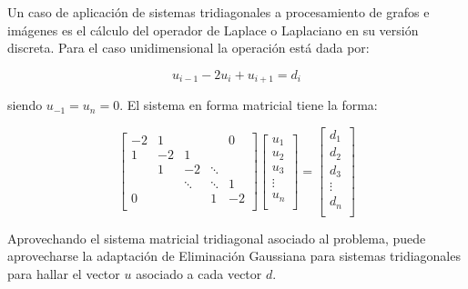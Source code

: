 Un caso de aplicación de sistemas tridiagonales a procesamiento de grafos e imágenes es el cálculo del operador de Laplace o Laplaciano en su versión discreta. Para el caso unidimensional la operación está dada por:

\begin{equation} \label{eq:laplaciano}
	u_{i-1} - 2u_{i} + u_{i+1} = d_{i}
\end{equation}

siendo $u_{-1} = u_{n} = 0$. El sistema en forma matricial tiene la forma:

\[
\begin{bmatrix}
-2 & 1 &  &  & 0 \\
1 & -2 & 1 &  &  \\
 & 1 & -2 & \ddots &  \\
 &  & \ddots & \ddots & 1 \\
0 &  &  & 1 & -2 \\
\end{bmatrix} 
\begin{bmatrix}
u_{1} \\
u_{2} \\
u_{3} \\
\vdots \\
u_{n} \\
\end{bmatrix}
=
\begin{bmatrix}
d_{1} \\
d_{2} \\
d_{3} \\
\vdots \\
d_{n} \\
\end{bmatrix}
\]

Aprovechando el sistema matricial tridiagonal asociado al problema, puede aprovecharse la adaptación de Eliminación Gaussiana para sistemas tridiagonales para hallar el vector $u$ asociado a cada vector $d$.
